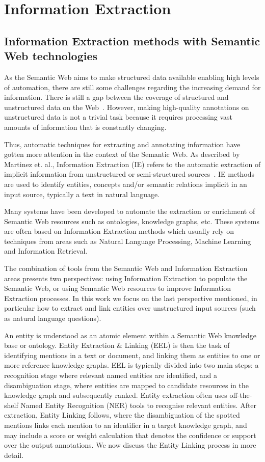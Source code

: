 \section{Information Extraction}
\label{cap3:infExtr}
\subsection{Information Extraction methods with Semantic Web technologies}
\label{cap3:infExtr/methods}
As the Semantic Web aims to make structured data available enabling high levels of 
automation, there are still some challenges regarding the increasing demand for information. 
There is still a gap between the coverage of structured and unstructured data on the 
Web~\cite{infExtr:PolleresHHD10}. However, making high-quality annotations on unstructured 
data is not a trivial task because it requires processing vast amounts of information that 
is constantly changing. 

Thus, automatic techniques for extracting and annotating information have gotten more 
attention in the context of the Semantic Web. As described by Martinez et. al., Information 
Extraction (IE) refers to the automatic extraction of implicit information from unstructured 
or semi-structured sources~\cite{infExtr:MartinezHL19}. IE methods are used to identify 
entities, concepts and/or semantic relations implicit in an input source, typically a text 
in natural language. 

Many systems have been developed to automate the extraction or enrichment of Semantic Web 
resources such as ontologies, knowledge graphs, etc. These systems are often based on 
Information Extraction methods which usually rely on techniques from areas such as Natural 
Language Processing, Machine Learning and Information Retrieval. 

The combination of tools from the Semantic Web and Information Extraction areas presents two 
perspectives: using Information Extraction to populate the Semantic Web, or using Semantic 
Web resources to improve Information Extraction processes. In this work we focus on the last 
perspective mentioned, in particular how to extract and link entities over unstructured input 
sources (such as natural language questions).

An entity is understood as an atomic element within a Semantic Web knowledge base or ontology. 
Entity Extraction \& Linking (EEL) is then the task of identifying mentions in a text or 
document, and linking them as entities to one or more reference knowledge graphs. EEL is 
typically divided into two main steps: a recognition stage where relevant named entities are 
identified, and a disambiguation stage, where entities are mapped to candidate resources in 
the knowledge graph and subsequently ranked. Entity extraction often uses off-the-shelf Named 
Entity Recognition (NER) tools to recognise relevant entities. After extraction, Entity 
Linking follows, where the disambiguation of the spotted mentions links each mention to an 
identifier in a target knowledge graph, and may include a score or weight calculation that 
denotes the confidence or support over the output annotations. We now discuss the Entity 
Linking process in more detail.

